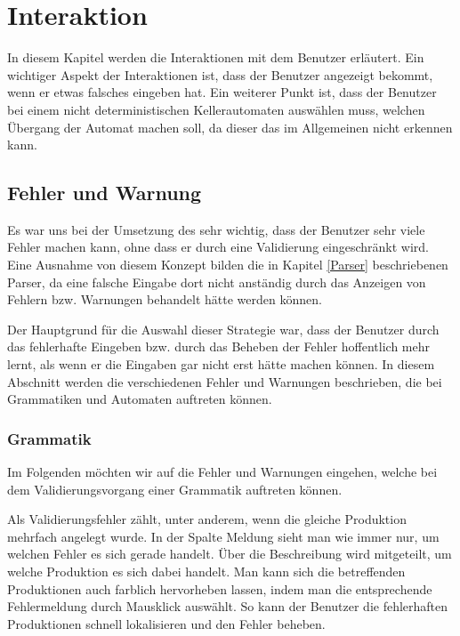 

\chapter{Interaktion}\label{Interaction}

In diesem Kapitel werden die Interaktionen mit dem Benutzer erläutert. Ein
wichtiger Aspekt der Interaktionen ist, dass der Benutzer angezeigt bekommt,
wenn er etwas falsches eingeben hat. Ein weiterer Punkt ist, dass der Benutzer
bei einem nicht deterministischen Kellerautomaten auswählen muss, welchen
Übergang der Automat machen soll, da dieser das im Allgemeinen nicht erkennen
kann.\vspace{10pt}


\section{Fehler und Warnung}\label{InteractionErrorWarning}

Es war uns bei der Umsetzung des \gtitools sehr wichtig, dass der Benutzer sehr
viele Fehler machen kann, ohne dass er durch eine Validierung eingeschränkt wird.
Eine Ausnahme von diesem Konzept bilden die in Kapitel \ref{Parser} beschriebenen
Parser, da eine falsche Eingabe dort nicht anständig durch das Anzeigen von
Fehlern bzw. Warnungen behandelt hätte werden können.\vspace{10pt}

Der Hauptgrund für die Auswahl dieser Strategie war, dass der Benutzer durch das
fehlerhafte Eingeben bzw. durch das Beheben der Fehler hoffentlich mehr lernt,
als wenn er die Eingaben gar nicht erst hätte machen können. In diesem Abschnitt
werden die verschiedenen Fehler und Warnungen beschrieben, die bei Grammatiken und
Automaten auftreten können.\vspace{10pt}


\subsection{Grammatik}\label{InteractionGrammar}

Im Folgenden möchten wir auf die Fehler und Warnungen eingehen, welche bei dem
Validierungsvorgang einer Grammatik auftreten können.\vspace{10pt}

Als Validierungsfehler zählt, unter anderem, wenn die gleiche Produktion mehrfach
angelegt wurde. In der Spalte Meldung sieht man wie immer nur, um welchen Fehler
es sich gerade handelt. Über die Beschreibung wird mitgeteilt, um welche
Produktion es sich dabei handelt. Man kann sich die betreffenden Produktionen
auch farblich hervorheben lassen, indem man die entsprechende Fehlermeldung durch
Mausklick auswählt. So kann der Benutzer die fehlerhaften Produktionen schnell
lokalisieren und den Fehler beheben.\vspace{10pt}


